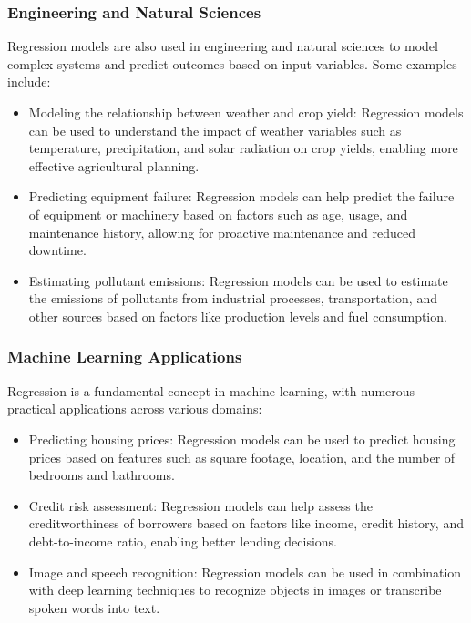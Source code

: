 \documentclass{article}
\begin{document}
\subsubsection{Engineering and Natural Sciences}

Regression models are also used in engineering and natural sciences to model complex systems and predict outcomes based on input variables. Some examples include:

\begin{itemize}
\item Modeling the relationship between weather and crop yield: Regression models can be used to understand the impact of weather variables such as temperature, precipitation, and solar radiation on crop yields, enabling more effective agricultural planning.
\item Predicting equipment failure: Regression models can help predict the failure of equipment or machinery based on factors such as age, usage, and maintenance history, allowing for proactive maintenance and reduced downtime.
\item Estimating pollutant emissions: Regression models can be used to estimate the emissions of pollutants from industrial processes, transportation, and other sources based on factors like production levels and fuel consumption.
\end{itemize}

\subsubsection{Machine Learning Applications}

Regression is a fundamental concept in machine learning, with numerous practical applications across various domains:

\begin{itemize}
\item Predicting housing prices: Regression models can be used to predict housing prices based on features such as square footage, location, and the number of bedrooms and bathrooms.
\item Credit risk assessment: Regression models can help assess the creditworthiness of borrowers based on factors like income, credit history, and debt-to-income ratio, enabling better lending decisions.
\item Image and speech recognition: Regression models can be used in combination with deep learning techniques to recognize objects in images or transcribe spoken words into text.
\end{itemize}
\end{document}
